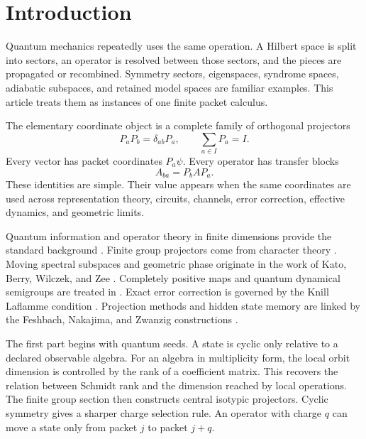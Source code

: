 \section{Introduction}\label{strong:section:001}\label{strong:sec:introduction}

Quantum mechanics repeatedly uses the same operation. A Hilbert space is split into sectors, an operator is resolved between those sectors, and the pieces are propagated or recombined. Symmetry sectors, eigenspaces, syndrome spaces, adiabatic subspaces, and retained model spaces are familiar examples. This article treats them as instances of one finite packet calculus.

The elementary coordinate object is a complete family of orthogonal projectors
\[
P_aP_b=\delta_{ab}P_a,
\qquad
\sum_{a\in I}P_a=I.
\]
Every vector has packet coordinates \(P_a\psi\). Every operator has transfer blocks
\[
A_{ba}=P_bAP_a.
\]
These identities are simple. Their value appears when the same coordinates are used across representation theory, circuits, channels, error correction, effective dynamics, and geometric limits.

Quantum information and operator theory in finite dimensions provide the standard background \cite{NielsenChuang2010,Watrous2018,Bhatia1997}. Finite group projectors come from character theory \cite{Serre1977,FultonHarris1991}. Moving spectral subspaces and geometric phase originate in the work of Kato, Berry, Wilczek, and Zee \cite{Kato1950,Kato1995,Berry1984,WilczekZee1984}. Completely positive maps and quantum dynamical semigroups are treated in \cite{Stinespring1955,Choi1975,Kraus1983,Lindblad1976}. Exact error correction is governed by the Knill Laflamme condition \cite{KnillLaflamme1997,SchumacherNielsen1996,BenyKempfKribs2007}. Projection methods and hidden state memory are linked by the Feshbach, Nakajima, and Zwanzig constructions \cite{Feshbach1958,Nakajima1958,Zwanzig1960,BravyiDiVincenzoLoss2011}.

The first part begins with quantum seeds. A state is cyclic only relative to a declared observable algebra. For an algebra in multiplicity form, the local orbit dimension is controlled by the rank of a coefficient matrix. This recovers the relation between Schmidt rank and the dimension reached by local operations. The finite group section then constructs central isotypic projectors. Cyclic symmetry gives a sharper charge selection rule. An operator with charge \(q\) can move a state only from packet \(j\) to packet \(j+q\).

